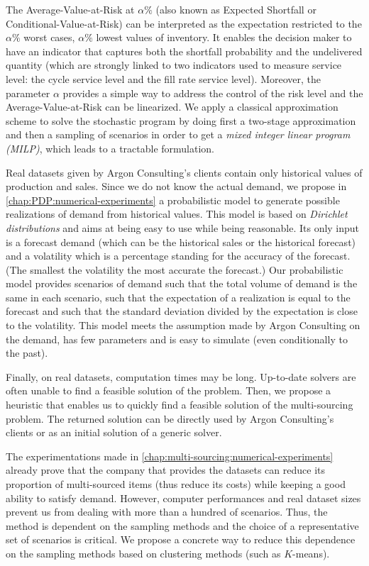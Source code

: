 The Average-Value-at-Risk at $\alpha\%$ (also known as Expected Shortfall or Conditional-Value-at-Risk) can be interpreted as the expectation restricted to the $\alpha\%$ worst cases, \ie $\alpha\%$ lowest values of inventory.
It enables the decision maker to have an indicator that captures both the shortfall probability and the undelivered quantity (which are strongly linked to two indicators used to measure service level: the cycle service level and the fill rate service level).
Moreover, the parameter $\alpha$ provides a simple way to address the control of the risk level and the Average-Value-at-Risk can be linearized.
We apply a classical approximation scheme to solve the stochastic program by doing first a two-stage approximation and then a sampling of scenarios in order to get a \emph{mixed integer linear program (MILP)}, which leads to a tractable formulation.


\medskip


Real datasets given by Argon Consulting's clients contain only historical values of production and sales.
Since we do not know the actual demand, we propose in \cref{chap:PDP:numerical-experiments} a probabilistic model to generate possible realizations of demand from historical values.
This model is based on \emph{Dirichlet distributions} and aims at being easy to use while being reasonable.
Its only input is a forecast demand (which can be the historical sales or the historical forecast) and a volatility which is a percentage standing for the accuracy of the forecast.
(The smallest the volatility the most accurate the forecast.)
Our probabilistic model provides scenarios of demand such that the total volume of demand is the same in each scenario, such that the expectation of a realization is equal to the forecast and such that the standard deviation divided by the expectation is close to the volatility.
This model meets the assumption made by Argon Consulting on the demand, has few parameters and is easy to simulate (even conditionally to the past).


\medskip


Finally, on real datasets, computation times may be long.
Up-to-date solvers are often unable to find a feasible solution of the problem.
Then, we propose a heuristic that enables us to quickly find a feasible solution of the multi-sourcing problem.
The returned solution can be directly used by Argon Consulting's clients or as an initial solution of a generic solver.


\medskip


The experimentations made in \cref{chap:multi-sourcing:numerical-experiments} already prove that the company that provides the datasets can reduce its proportion of multi-sourced items (thus reduce its costs) while keeping a good ability to satisfy demand.
However, computer performances and real dataset sizes prevent us from dealing with more than a hundred of scenarios.
Thus, the method is dependent on the sampling methods and the choice of a representative set of scenarios is critical.
We propose a concrete way to reduce this dependence on the sampling methods based on clustering methods (such as $K$-means).


